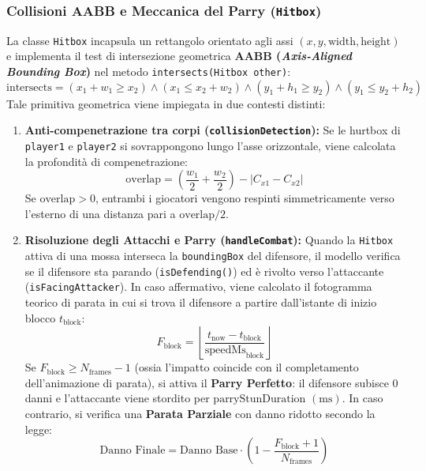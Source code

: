 \documentclass[11pt, a4paper]{article}
\begin{document}
\subsubsection{Collisioni AABB e Meccanica del Parry (\texttt{Hitbox})}
La classe \texttt{Hitbox} incapsula un rettangolo orientato agli assi $(x, y, \text{width}, \text{height})$ e implementa il test di intersezione geometrica \textbf{AABB (\emph{Axis-Aligned Bounding Box})} nel metodo \texttt{intersects(Hitbox other)}:
\begin{equation}
    \text{intersects} = (x_1 + w_1 \ge x_2) \land (x_1 \le x_2 + w_2) \land (y_1 + h_1 \ge y_2) \land (y_1 \le y_2 + h_2)
\end{equation}
Tale primitiva geometrica viene impiegata in due contesti distinti:
\begin{enumerate}
    \item \textbf{Anti-compenetrazione tra corpi (\texttt{collisionDetection}):} Se le hurtbox di \texttt{player1} e \texttt{player2} si sovrappongono lungo l'asse orizzontale, viene calcolata la profondità di compenetrazione:
    \begin{equation}
        \text{overlap} = \left(\frac{w_1}{2} + \frac{w_2}{2}\right) - \left|C_{x1} - C_{x2}\right|
    \end{equation}
    Se $\text{overlap} > 0$, entrambi i giocatori vengono respinti simmetricamente verso l'esterno di una distanza pari a $\text{overlap} / 2$.
    \item \textbf{Risoluzione degli Attacchi e Parry (\texttt{handleCombat}):} Quando la \texttt{Hitbox} attiva di una mossa interseca la \texttt{boundingBox} del difensore, il modello verifica se il difensore sta parando (\texttt{isDefending()}) ed è rivolto verso l'attaccante (\texttt{isFacingAttacker}). In caso affermativo, viene calcolato il fotogramma teorico di parata in cui si trova il difensore a partire dall'istante di inizio blocco $t_{\text{block}}$:
    \begin{equation}
        F_{\text{block}} = \left\lfloor \frac{t_{\text{now}} - t_{\text{block}}}{\text{speedMs}_{\text{block}}} \right\rfloor
    \end{equation}
    Se $F_{\text{block}} \ge N_{\text{frames}} - 1$ (ossia l'impatto coincide con il completamento dell'animazione di parata), si attiva il \textbf{Parry Perfetto}: il difensore subisce $0$ danni e l'attaccante viene stordito per $\text{parryStunDuration }(\text{ms})$. In caso contrario, si verifica una \textbf{Parata Parziale} con danno ridotto secondo la legge:
    \begin{equation}
        \text{Danno Finale} = \text{Danno Base} \cdot \left(1 - \frac{F_{\text{block}} + 1}{N_{\text{frames}}}\right)
    \end{equation}
\end{enumerate}
\end{document}
